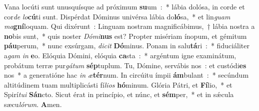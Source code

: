 Vana locúti sunt unusquísque ad próximum \textbf{su}um~:~* lábia dolósa, in corde et cor\textit{de} \textit{lo}\textbf{cú}ti sunt.
Dispérdat Dóminus univérsa lábia do\textbf{ló}sa,~* et lin\textit{guam} \textit{ma}\textbf{gní}loquam.
Qui dixérunt~: Linguam nostram magnificábimus,~† lábia nostra a \textbf{no}bis sunt,~* quis noster \textit{Dó}\textit{mi}\textbf{nus} est?
Propter misériam ínopum, et gémitum \textbf{páu}perum,~* nunc exsúrgam, \textit{di}\textit{cit} \textbf{Dó}minus.
Ponam in salu\textbf{tá}ri~:~* fiduciáliter a\textit{gam} \textit{in} \textbf{e}o.
Elóquia Dómini, elóquia \textbf{ca}sta~:~* argéntum igne examinátum, probátum terræ pur\textit{gá}\textit{tum} \textbf{sép}tuplum.
Tu, Dómine, servábis nos~: et custódi\textbf{es} nos~* a generatióne hac \textit{in} \textit{æ}\textbf{tér}num.
In circúitu ímpii \textbf{ám}bulant~:~* secúndum altitúdinem tuam multiplicásti fí\textit{li}\textit{os} \textbf{hó}minum.
Glória Pátri, et \textbf{Fí}lio,~* et Spirí\textit{tu}\textit{i} \textbf{Sán}cto.
Sicut érat in princípio, et núnc, et \textbf{sém}per,~* et in sǽcula sæcu\textit{ló}\textit{rum}. \textbf{A}men.
